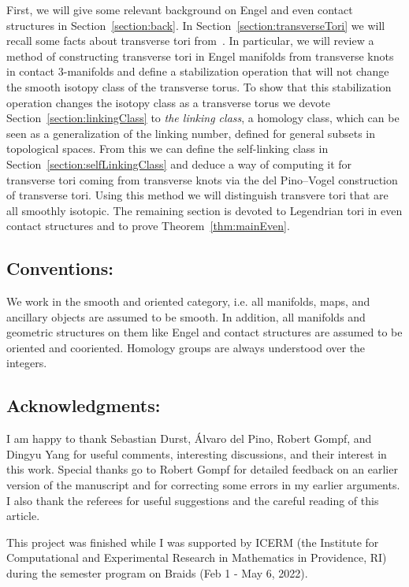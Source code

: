 \documentclass{amsart} %
\theoremstyle{thm}
\theoremstyle{definition}
\begin{document}
First, we will give some relevant background on Engel and even contact structures in Section~\ref{section:back}. In Section~\ref{section:transverseTori} we will recall some facts about transverse tori from~\cite{PV20}. In particular, we will review a method of constructing transverse tori in Engel manifolds from transverse knots in contact $3$-manifolds and define a stabilization operation that will not change the smooth isotopy class of the transverse torus. To show that this stabilization operation changes the isotopy class as a transverse torus we devote Section~\ref{section:linkingClass} to \textit{the linking class}, a homology class, which can be seen as a generalization of the linking number, defined for general subsets in topological spaces.
From this we can define the self-linking class in Section~\ref{section:selfLinkingClass} and deduce a way of computing it for transverse tori coming from transverse knots via the del Pino--Vogel construction of transverse tori. Using this method we will distinguish transvere tori that are all smoothly isotopic.
The remaining section is devoted to Legendrian tori in even contact structures and to prove Theorem~\ref{thm:mainEven}.



\subsection*{Conventions:} We work in the smooth and oriented category, i.e. all manifolds, maps, and ancillary objects are assumed to be smooth. In addition, all manifolds and geometric structures on them like Engel and contact structures are assumed to be oriented and cooriented. Homology groups are always understood over the integers.

\subsection*{Acknowledgments:} I am happy to thank Sebastian Durst, \'Alvaro del Pino, Robert Gompf, and Dingyu Yang for useful comments, interesting discussions, and their interest in this work. Special thanks go to Robert Gompf for detailed feedback on an earlier version of the manuscript and for correcting some errors in my earlier arguments. I also thank the referees for useful suggestions and the careful reading of this article.

This project was finished while I was supported by ICERM (the Institute for Computational and Experimental Research in Mathematics in
Providence, RI) during the semester program on Braids (Feb 1 - May 6, 2022).
\end{document}

